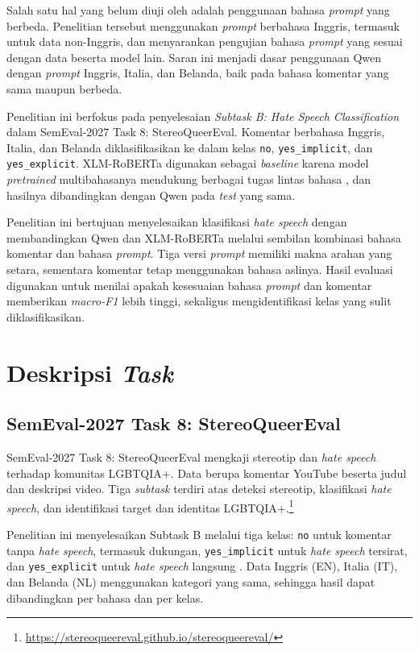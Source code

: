 \documentclass[11pt]{article}
\begin{document}
Salah satu hal yang belum diuji oleh \citet{chan-etal-2024-hate} adalah penggunaan bahasa \textit{prompt} yang berbeda. Penelitian tersebut menggunakan \textit{prompt} berbahasa Inggris, termasuk untuk data non-Inggris, dan menyarankan pengujian bahasa \textit{prompt} yang sesuai dengan data beserta model lain. Saran ini menjadi dasar penggunaan Qwen dengan \textit{prompt} Inggris, Italia, dan Belanda, baik pada bahasa komentar yang sama maupun berbeda.

Penelitian ini berfokus pada penyelesaian \textit{Subtask B: Hate Speech Classification} dalam SemEval-2027 Task 8: StereoQueerEval. Komentar berbahasa Inggris, Italia, dan Belanda diklasifikasikan ke dalam kelas \texttt{no}, \texttt{yes\_implicit}, dan \texttt{yes\_explicit}. XLM-RoBERTa digunakan sebagai \textit{baseline} karena model \textit{pretrained} multibahasanya mendukung berbagai tugas lintas bahasa \citep{conneau-etal-2020-unsupervised}, dan hasilnya dibandingkan dengan Qwen pada \textit{test} yang sama.

Penelitian ini bertujuan menyelesaikan klasifikasi \textit{hate speech} dengan membandingkan Qwen dan XLM-RoBERTa melalui sembilan kombinasi bahasa komentar dan bahasa \textit{prompt}. Tiga versi \textit{prompt} memiliki makna arahan yang setara, sementara komentar tetap menggunakan bahasa aslinya. Hasil evaluasi digunakan untuk menilai apakah kesesuaian bahasa \textit{prompt} dan komentar memberikan \textit{macro-F1} lebih tinggi, sekaligus mengidentifikasi kelas yang sulit diklasifikasikan.

\section{Deskripsi \textit{Task}}
\subsection{SemEval-2027 Task 8: StereoQueerEval}
\label{subsec:task-description}

SemEval-2027 Task 8: StereoQueerEval mengkaji stereotip dan \textit{hate speech} terhadap komunitas LGBTQIA+. Data berupa komentar YouTube beserta judul dan deskripsi video. Tiga \textit{subtask} terdiri atas deteksi stereotip, klasifikasi \textit{hate speech}, dan identifikasi target dan identitas LGBTQIA+.\footnote{\url{https://stereoqueereval.github.io/stereoqueereval/}}

Penelitian ini menyelesaikan Subtask B melalui tiga kelas: \texttt{no} untuk komentar tanpa \textit{hate speech}, termasuk dukungan, \nolinkurl{yes_implicit} untuk \textit{hate speech} tersirat, dan \nolinkurl{yes_explicit} untuk \textit{hate speech} langsung \citep{stereoqueereval-2026-data}. Data Inggris (EN), Italia (IT), dan Belanda (NL) menggunakan kategori yang sama, sehingga hasil dapat dibandingkan per bahasa dan per kelas.
\end{document}
